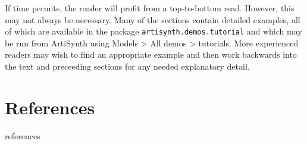 \documentclass{book}
\begin{document}
If time permits, the reader will profit from a top-to-bottom read.
However, this may not always be necessary. Many of the sections
contain detailed examples, all of which are available in
the package {\tt artisynth.demos.tutorial} and which may be run from
ArtiSynth using {\sf Models > All demos > tutorials}. 
More experienced readers may wish to find an appropriate example and
then work backwards into the text and preceeding sections for any
needed explanatory detail.

\mainmatter

















\iflatexml


\else
\chapter*{References}

\begin{btSect}{references}
\btPrintCited
\end{btSect}
\fi
\end{document}
